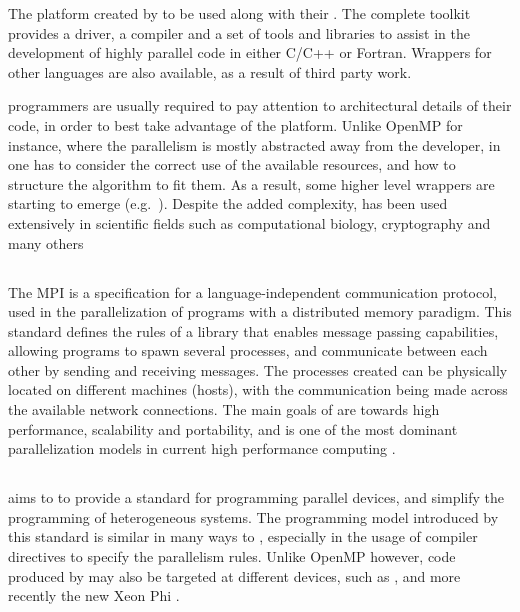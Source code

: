 \documentclass[main.tex]{subfiles}
\begin{document}
The platform created by \nvidia to be used along with their \gpus. The complete \cuda toolkit provides a driver, a compiler and a set of tools and libraries to assist in the development of highly parallel \gpu code in either C/C++ or Fortran. Wrappers for other languages are also available, as a result of third party work.

\cuda programmers are usually required to pay attention to architectural details of their code, in order to best take advantage of the platform. Unlike OpenMP for instance, where the parallelism is mostly abstracted away from the developer, in \cuda one has to consider the correct use of the available resources, and how to structure the algorithm to fit them. As a result, some higher level wrappers are starting to emerge (e.g.\ \openacc). Despite the added complexity, \cuda has been used extensively in scientific fields such as computational biology, cryptography and many others \cite{manavski2008cuda,vasiliadis2008gnort,manavski2007cuda}



\subsection{\mpi}

The \acf{MPI} is a specification for a language-independent communication protocol, used in the parallelization of programs with a distributed memory paradigm. This standard defines the rules of a library that enables message passing capabilities, allowing programs to spawn several processes, and communicate between each other by sending and receiving messages. The processes created can be physically located on different machines (hosts), with the communication being made across the available network connections. The main goals of \mpi are towards high performance, scalability and portability, and is one of the most dominant parallelization models in current high performance computing \cite{sur2006high}.


\subsection{\openacc}
\openacc aims to to provide a standard for programming parallel devices, and simplify the programming of heterogeneous systems.
The programming model introduced by this standard is similar in many ways to \openmp, especially in the usage of compiler directives to specify the parallelism rules. Unlike \acs{OpenMP} however, code produced by \openacc may also be targeted at different devices, such as \gpus, and more recently the new \intel Xeon Phi \cite{openacc-phi2012}.
\end{document}
